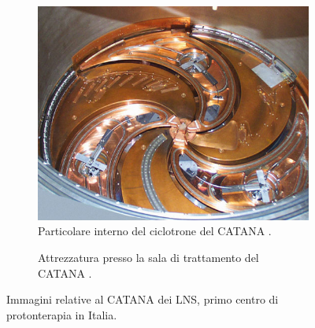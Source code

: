 \documentclass[12pt,a4paper,twoside]{report}
\begin{document}
	\begin{figure}[H]
		\centering
		\begin{subfigure}[b]{0.49\textwidth}
			\centering
			\includegraphics[width=\textwidth, scale=0.5]{catana1.jpg}
			\caption{Particolare interno del ciclotrone del CATANA \cite{asimmetrie_catana}.}
			\label{fig:catana1}
		\end{subfigure}
		\hfill
		\begin{subfigure}[b]{0.49\textwidth}
			\centering
			\caption{Attrezzatura presso la sala di trattamento del CATANA \cite{asimmetrie_DLAS}.}
			\label{fig:catana2}
		\end{subfigure}
		\caption{Immagini relative al CATANA dei LNS, primo centro di protonterapia in Italia.}
		\label{fig:catana}
	\end{figure}
\end{document}
